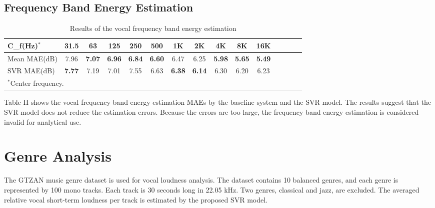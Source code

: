 \documentclass[conference]{IEEEtran}
\begin{document}
\subsection{Frequency Band Energy Estimation}
\FloatBarrier
\bgroup
\def\arraystretch{1.3}%
\setlength{\tabcolsep}{3pt}
\begin{table}[h]
\centering
 \caption{Results of the vocal frequency band energy estimation}
 \vspace*{-5mm}
 \begin{center}
\begin{tabular}{l*{13}{c}r}
\hline
\hline
C_f(Hz)$^{\mathrm{*}}$ & 31.5  & 63 & 125  &  250 & 500  & 1K  & 2K & 4K & 8K & 16K \\
\hline
Mean MAE(dB) & 7.96 & \textbf{7.07} &
 \textbf{6.96} & \textbf{6.84} &  \textbf{6.60} &  6.47 & 6.25 & \textbf{5.98} &
 \textbf{5.65} &\textbf{5.49}  \\
 SVR MAE(dB) & \textbf{7.77} & 7.19 &
  7.01 &  7.55  & 6.63  & \textbf{6.38}  & \textbf{6.14} & 6.30 &
  6.20  & 6.23  \\
  \hline
 \multicolumn{4}{l}{$^{\mathrm{*}}$Center frequency.}
\end{tabular}
\egroup
\end{center}
\end{table}
\FloatBarrier

Table II shows the vocal frequency band energy estimation MAEs by the baseline system and the SVR model. The results suggest that the SVR model does not reduce the estimation errors. Because the errors are too large, the frequency band energy estimation is considered invalid for analytical use.
\section{Genre Analysis}

The GTZAN music genre dataset \cite{tzanetakis_essl_cook_2001} is used for vocal loudness analysis. The dataset contains 10 balanced genres, and each genre is represented by 100 mono tracks. Each track is 30 seconds long in 22.05 kHz. Two genres, classical and jazz, are excluded. The averaged relative vocal short-term loudness per track is estimated by the proposed SVR model.
\end{document}
